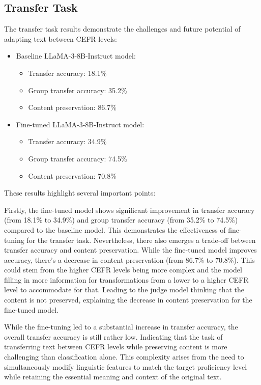 \subsection{Transfer Task}
\label{ss:transfer_task}

The transfer task results demonstrate the challenges and future potential of adapting text between CEFR levels:

\begin{itemize}
    \item Baseline LLaMA-3-8B-Instruct model:
    \begin{itemize}
        \item Transfer accuracy: 18.1\%
        \item Group transfer accuracy: 35.2\%
        \item Content preservation: 86.7\%
    \end{itemize}
    \item Fine-tuned LLaMA-3-8B-Instruct model:
    \begin{itemize}
        \item Transfer accuracy: 34.9\%
        \item Group transfer accuracy: 74.5\%
        \item Content preservation: 70.8\%
    \end{itemize}
\end{itemize}

These results highlight several important points: 

Firstly, the fine-tuned model shows significant improvement in transfer accuracy (from 18.1\% to 34.9\%) and group transfer accuracy (from 35.2\% to 74.5\%) compared to the baseline model. This demonstrates the effectiveness of fine-tuning for the transfer task. Nevertheless, there also emerges a trade-off between transfer accuracy and content preservation. While the fine-tuned model improves accuracy, there's a decrease in content preservation (from 86.7\% to 70.8\%). This could stem from the higher CEFR levels being more complex and the model filling in more information for transformations from a lower to a higher CEFR level to accommodate for that. Leading to the judge model thinking that the content is not preserved, explaining the decrease in content preservation for the fine-tuned model.

While the fine-tuning led to a substantial increase in transfer accuracy, the overall transfer accuracy is still rather low. Indicating that the task of transferring text between CEFR levels while preserving content is more challenging than classification alone. This complexity arises from the need to simultaneously modify linguistic features to match the target proficiency level while retaining the essential meaning and context of the original text.

